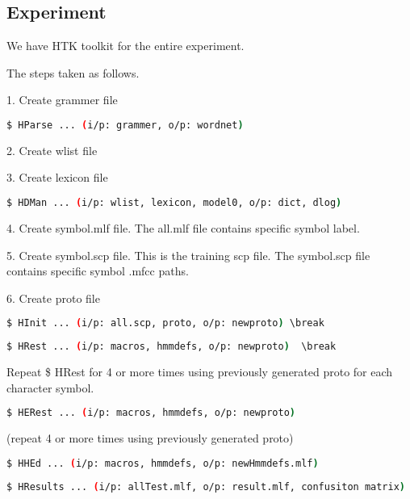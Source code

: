 \subsection{Experiment}
\begin{flushleft}
  We have HTK toolkit for the entire experiment.
  
  The steps taken as follows. \break
  
  1. Create grammer file \break
  \begin{lstlisting}[language=bash]
    $ HParse ... (i/p: grammer, o/p: wordnet)
  \end{lstlisting}
  2. Create {wlist} file \break
  
  3. Create {lexicon} file \break
  \begin{lstlisting}[language=bash]
    $ HDMan ... (i/p: wlist, lexicon, model0, o/p: dict, dlog)
 \end{lstlisting}
  4. Create {symbol.mlf} file. The all.mlf file contains specific symbol label. \break
  
  5. Create {symbol.scp} file. This is the training scp file. The symbol.scp file contains specific symbol .mfcc paths. \break
  
  6. Create {proto} file \break
  \begin{lstlisting}[language=bash]
    $ HInit ... (i/p: all.scp, proto, o/p: newproto) \break 
  \end{lstlisting}
    \begin{lstlisting}[language=bash]
    $ HRest ... (i/p: macros, hmmdefs, o/p: newproto)  \break 
  \end{lstlisting}
    Repeat \$ HRest for 4 or more times using previously generated proto for each character symbol.
  
  
  \begin{lstlisting}[language=bash]
    $ HERest ... (i/p: macros, hmmdefs, o/p: newproto)
    \end{lstlisting}
    (repeat 4 or more times using previously generated proto)
    \break
    
    \begin{lstlisting}[language=bash]
    $ HHEd ... (i/p: macros, hmmdefs, o/p: newHmmdefs.mlf)
    \end{lstlisting}

    
    \begin{lstlisting}[language=bash]
        $ HResults ... (i/p: allTest.mlf, o/p: result.mlf, confusiton matrix)
    \end{lstlisting}
    

\end{flushleft}
